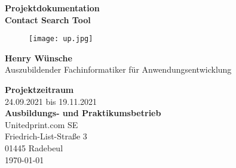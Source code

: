 \begin{titlepage}
    \begin{center}
        {\LARGE\textbf{Projektdokumentation\\}}
        \vspace*{0.5cm}
        {\Huge\textbf{Contact Search Tool}}
        \vspace*{2cm}
        \begin{figure}[hbp]
            \begin{center}
                \texttt{[image: up.jpg]}
            \end{center}
        \end{figure}

        \vfill

        {\textbf{Henry Wünsche}} \\
        Auszubildender Fachinformatiker für Anwendungsentwicklung

        \vspace{0.8cm}
        {\textbf{Projektzeitraum}}\\
        24.09.2021 bis 19.11.2021\\
        \vspace{0.8cm}
        \textbf{Ausbildungs- und Praktikumsbetrieb}\\
        Unitedprint.com SE\\
        Friedrich-List-Straße 3\\
        01445 Radebeul\\
        \vspace*{0.8cm}
        \today
    \end{center}
\end{titlepage}
\pagebreak
